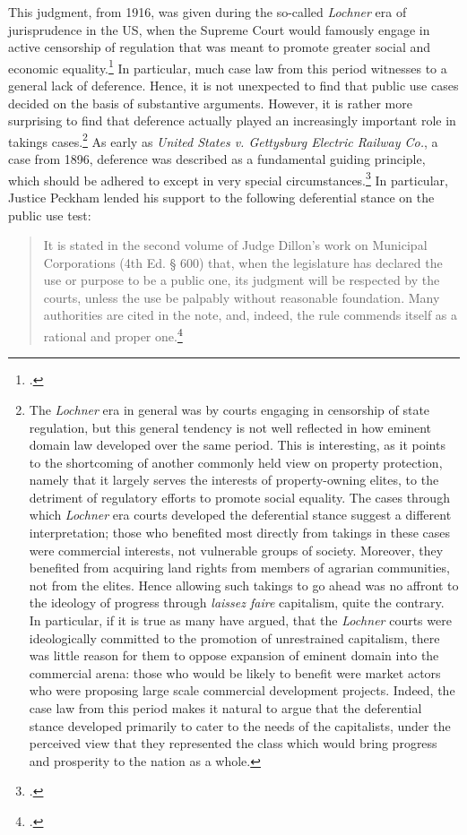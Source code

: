This judgment, from 1916, was given during the so-called {\it Lochner} era of jurisprudence in the US, when the Supreme Court  would famously engage in active censorship of regulation that was meant to promote greater social and economic equality.\footcite{cohen08} In particular, much case law from this period witnesses to a general lack of deference. Hence, it is not unexpected to find that public use cases decided on the basis of substantive arguments. However, it is rather more surprising to find that deference actually played an increasingly important role in takings cases.\footnote{The {\it Lochner} era in general was  by courts engaging in censorship of state regulation, but this general tendency is not well reflected in how eminent domain law developed over the same period. This is interesting, as it points to the shortcoming of another commonly held view on property protection, namely that it largely serves the interests of property-owning elites, to the detriment of regulatory efforts to promote social equality. The cases through which {\it Lochner} era courts developed the deferential stance suggest a different interpretation; those who benefited most directly from takings in these cases were commercial interests, not vulnerable groups of society. Moreover, they benefited from acquiring land rights from members of agrarian communities, not from the elites. Hence allowing such takings to go ahead was no affront to the ideology of progress through {\it laissez faire} capitalism, quite the contrary. In particular, if it is true as many have argued, that the {\it Lochner} courts were ideologically committed to the promotion of unrestrained capitalism, there was little reason for them to oppose expansion of eminent domain into the commercial arena: those who would be likely to benefit were market actors who were proposing large scale commercial development projects. Indeed, the case law from this period makes it natural to argue that the deferential stance developed primarily to cater to the needs of the capitalists, under the perceived view that they represented the class which would bring progress and prosperity to the nation as a whole.} As early as { \it United States v. Gettysburg Electric Railway Co.}, a case from 1896, deference was described as a fundamental guiding principle, which should be adhered to except in very special circumstances.\footcite{gettysburg96} In particular, Justice Peckham lended his support to the following deferential stance on the public use test:

\begin{quote}
It is stated in the second volume of Judge Dillon's work on Municipal Corporations (4th Ed. § 600) that, when the legislature has declared the use or purpose to be a public one, its judgment will be respected by the courts, unless the use be palpably without reasonable foundation. Many authorities are cited in the note, and, indeed, the rule commends itself as a rational and proper one.\footcite[680]{gettysburg96}
\end{quote}

